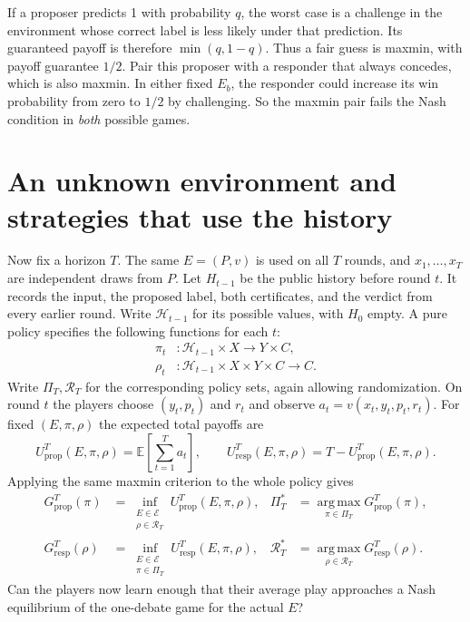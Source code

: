 \documentclass[11pt]{article}
\newcommand{\E}{\mathbb E}
\newcommand{\argmax}{\operatorname*{arg\,max}}
\begin{document}
If a proposer predicts 1 with probability \(q\), the worst case is a
challenge in the environment whose correct label is less likely under
that prediction. Its guaranteed payoff is therefore \(\min(q,1-q)\).
Thus a fair guess is maxmin, with
payoff guarantee \(1/2\). Pair this proposer with a responder that always
concedes, which is also maxmin. In either fixed \(E_b\), the responder
could increase its win probability from zero to \(1/2\) by challenging.
So the maxmin pair fails the Nash condition in \emph{both} possible games.

\section{An unknown environment and strategies that use the history}

Now fix a horizon \(T\). The same \(E=(P,v)\) is used on all \(T\) rounds,
and \(x_1,\ldots,x_T\) are independent draws from \(P\). Let \(H_{t-1}\)
be the public history before round \(t\). It records the input, the proposed
label, both certificates, and the verdict from every earlier round. Write
\(\mathcal H_{t-1}\) for its possible values, with \(H_0\) empty. A pure
policy specifies the following functions for each \(t\):
\[
\begin{aligned}
   \pi_t &: \mathcal H_{t-1}\times X\longrightarrow Y\times C,\\
   \rho_t &: \mathcal H_{t-1}\times X\times Y\times C\longrightarrow C.
\end{aligned}
\]
Write \(\Pi_T,\mathcal R_T\) for the corresponding policy sets, again
allowing randomization. On round \(t\) the players choose \((y_t,p_t)\)
and \(r_t\) and observe \(a_t=v(x_t,y_t,p_t,r_t)\). For fixed
\((E,\pi,\rho)\) the expected total payoffs are
\[
   U_{\mathrm{prop}}^T(E,\pi,\rho)=\E\!\left[\sum_{t=1}^T a_t\right],
   \qquad
   U_{\mathrm{resp}}^T(E,\pi,\rho)=T-U_{\mathrm{prop}}^T(E,\pi,\rho).
\]
Applying the same maxmin criterion to the whole policy gives
\[
\begin{aligned}
   G_{\mathrm{prop}}^T(\pi)
     &=\inf_{\substack{E\in\mathcal E\\\rho\in\mathcal R_T}}
       U_{\mathrm{prop}}^T(E,\pi,\rho),
   & \Pi_T^*&=\argmax_{\pi\in\Pi_T}G_{\mathrm{prop}}^T(\pi),\\
   G_{\mathrm{resp}}^T(\rho)
     &=\inf_{\substack{E\in\mathcal E\\\pi\in\Pi_T}}
       U_{\mathrm{resp}}^T(E,\pi,\rho),
   & \mathcal R_T^*&=\argmax_{\rho\in\mathcal R_T}G_{\mathrm{resp}}^T(\rho).
\end{aligned}
\]
Can the players now learn enough that their average play approaches a
Nash equilibrium of the one-debate game for the actual \(E\)?
\end{document}
